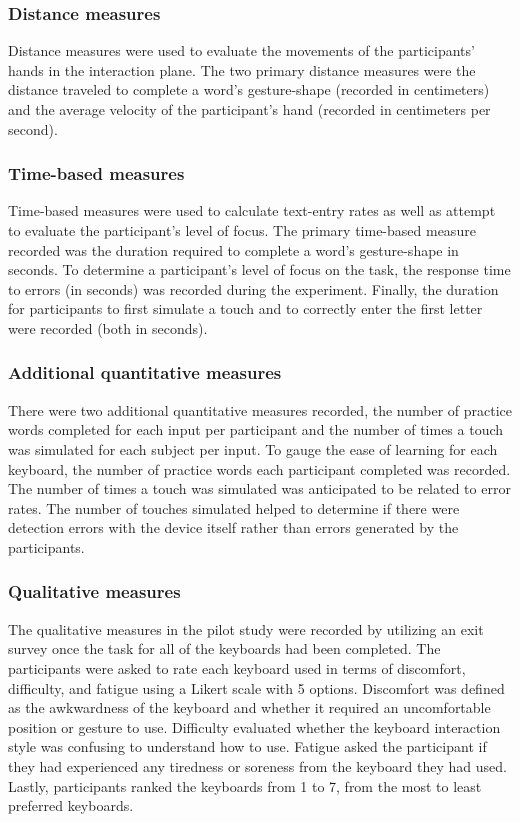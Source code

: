\subsubsection{Distance measures}
Distance measures were used to evaluate the movements of the participants' hands in the interaction plane. The two primary distance measures were the distance traveled to complete a word's gesture-shape (recorded in centimeters) and the average velocity of the participant's hand (recorded in centimeters per second).

\subsubsection{Time-based measures}
Time-based measures were used to calculate text-entry rates as well as attempt to evaluate the participant's level of focus. The primary time-based measure recorded was the duration required to complete a word's gesture-shape in seconds. To determine a participant's level of focus on the task, the response time to errors (in seconds) was recorded during the experiment. Finally, the duration for participants to first simulate a touch and to correctly enter the first letter were recorded (both in seconds).

\subsubsection{Additional quantitative measures}
There were two additional quantitative measures recorded, the number of practice words completed for each input per participant and the number of times a touch was simulated for each subject per input. To gauge the ease of learning for each keyboard, the number of practice words each participant completed was recorded. The number of times a touch was simulated was anticipated to be related to error rates. The number of touches simulated helped to determine if there were detection errors with the device itself rather than errors generated by the participants.

\subsubsection{Qualitative measures}
The qualitative measures in the pilot study were recorded by utilizing an exit survey once the task for all of the keyboards had been completed. The participants were asked to rate each keyboard used in terms of discomfort, difficulty, and fatigue using a Likert scale with 5 options. Discomfort was defined as the awkwardness of the keyboard and whether it required an uncomfortable position or gesture to use. Difficulty evaluated whether the keyboard interaction style was confusing to understand how to use. Fatigue asked the participant if they had experienced any tiredness or soreness from the keyboard they had used. Lastly, participants ranked the keyboards from 1 to 7, from the most to least preferred keyboards.

